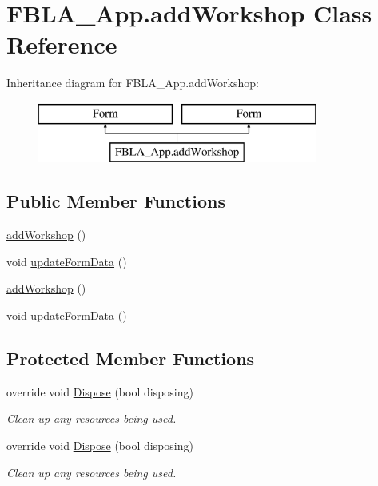 \hypertarget{class_f_b_l_a___app_1_1add_workshop}{\section{F\+B\+L\+A\+\_\+\+App.\+add\+Workshop Class Reference}
\label{class_f_b_l_a___app_1_1add_workshop}
}
Inheritance diagram for F\+B\+L\+A\+\_\+\+App.\+add\+Workshop\+:\begin{figure}[H]
\begin{center}
\leavevmode
\includegraphics[height=2.000000cm]{class_f_b_l_a___app_1_1add_workshop}
\end{center}
\end{figure}
\subsection*{Public Member Functions}
\begin{DoxyCompactItemize}
\item 
\hyperlink{class_f_b_l_a___app_1_1add_workshop_ae42a28e410a653f3831e1bf450481c13}{add\+Workshop} ()
\item 
void \hyperlink{class_f_b_l_a___app_1_1add_workshop_af790688781cfecb73bf3e5bdb393ff41}{update\+Form\+Data} ()
\item 
\hyperlink{class_f_b_l_a___app_1_1add_workshop_ae42a28e410a653f3831e1bf450481c13}{add\+Workshop} ()
\item 
void \hyperlink{class_f_b_l_a___app_1_1add_workshop_af790688781cfecb73bf3e5bdb393ff41}{update\+Form\+Data} ()
\end{DoxyCompactItemize}
\subsection*{Protected Member Functions}
\begin{DoxyCompactItemize}
\item 
override void \hyperlink{class_f_b_l_a___app_1_1add_workshop_a50e9c16aaec8968c7e3e025335ff69ba}{Dispose} (bool disposing)
\begin{DoxyCompactList}\small\item\em Clean up any resources being used. \end{DoxyCompactList}\item 
override void \hyperlink{class_f_b_l_a___app_1_1add_workshop_a50e9c16aaec8968c7e3e025335ff69ba}{Dispose} (bool disposing)
\begin{DoxyCompactList}\small\item\em Clean up any resources being used. \end{DoxyCompactList}\end{DoxyCompactItemize}


